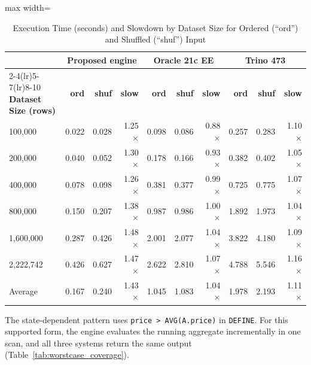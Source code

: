 \documentclass[preprint,12pt,times,a4paper]{elsarticle}
\begin{document}
\begin{table}[t]
\centering\small

\setlength{\tabcolsep}{4pt}
\begin{adjustbox}{max width=\textwidth}
\begin{tabular}{lrrrrrrrrr}
\toprule
 & \multicolumn{3}{c}{\textbf{Proposed engine}} & \multicolumn{3}{c}{\textbf{Oracle 21c EE}} & \multicolumn{3}{c}{\textbf{Trino 473}} \\
\cmidrule(lr){2-4}\cmidrule(lr){5-7}\cmidrule(lr){8-10}
\textbf{Dataset Size (rows)} & \textbf{ord} & \textbf{shuf} & \textbf{slow} & \textbf{ord} & \textbf{shuf} & \textbf{slow} & \textbf{ord} & \textbf{shuf} & \textbf{slow} \\
\midrule
100,000 & 0.022 & 0.028 & 1.25$\times$ & 0.098 & 0.086 & 0.88$\times$ & 0.257 & 0.283 & 1.10$\times$ \\
200,000 & 0.040 & 0.052 & 1.30$\times$ & 0.178 & 0.166 & 0.93$\times$ & 0.382 & 0.402 & 1.05$\times$ \\
400,000 & 0.078 & 0.098 & 1.26$\times$ & 0.381 & 0.377 & 0.99$\times$ & 0.725 & 0.775 & 1.07$\times$ \\
800,000 & 0.150 & 0.207 & 1.38$\times$ & 0.987 & 0.986 & 1.00$\times$ & 1.892 & 1.973 & 1.04$\times$ \\
1,600,000 & 0.287 & 0.426 & 1.48$\times$ & 2.001 & 2.077 & 1.04$\times$ & 3.822 & 4.180 & 1.09$\times$ \\
2,222,742 & 0.426 & 0.627 & 1.47$\times$ & 2.622 & 2.810 & 1.07$\times$ & 4.788 & 5.546 & 1.16$\times$ \\
\midrule
Average & 0.167 & 0.240 & 1.43$\times$ & 1.045 & 1.083 & 1.04$\times$ & 1.978 & 2.193 & 1.11$\times$ \\
\bottomrule
\end{tabular}
\end{adjustbox}
\caption{Execution Time (seconds) and Slowdown by Dataset Size for Ordered (``ord'') and Shuffled (``shuf'') Input}
\label{tab:ordering_by_size}
\end{table}

The state-dependent pattern uses \texttt{price > AVG(A.price)} in
\texttt{DEFINE}. For this supported form, the engine evaluates the running
aggregate incrementally in one scan, and all three systems return the same
output (Table~\ref{tab:worstcase_coverage}).
\end{document}
